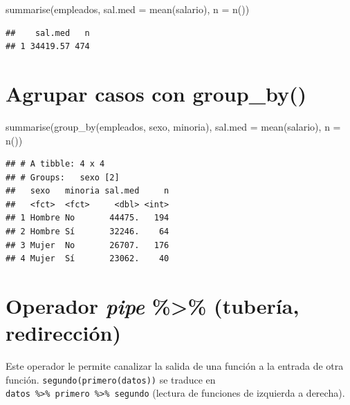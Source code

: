 \documentclass[
]{book}
\newenvironment{Shaded}{\begin{snugshade}}{\end{snugshade}}
\newcommand{\AttributeTok}[1]{\textcolor[rgb]{0.77,0.63,0.00}{#1}}
\newcommand{\FunctionTok}[1]{\textcolor[rgb]{0.00,0.00,0.00}{#1}}
\newcommand{\NormalTok}[1]{#1}
\theoremstyle{break}
\theoremstyle{nonumberplain}
\begin{document}
\begin{Shaded}
\begin{Highlighting}[]
\FunctionTok{summarise}\NormalTok{(empleados, }\AttributeTok{sal.med =} \FunctionTok{mean}\NormalTok{(salario), }\AttributeTok{n =} \FunctionTok{n}\NormalTok{())}
\end{Highlighting}
\end{Shaded}

\begin{verbatim}
##    sal.med   n
## 1 34419.57 474
\end{verbatim}

\hypertarget{agrupar-casos-con-group_by}{%
\section{\texorpdfstring{Agrupar casos con \textbf{group\_by()}}{Agrupar casos con group\_by()}}\label{agrupar-casos-con-group_by}}

\begin{Shaded}
\begin{Highlighting}[]
\FunctionTok{summarise}\NormalTok{(}\FunctionTok{group\_by}\NormalTok{(empleados, sexo, minoria), }\AttributeTok{sal.med =} \FunctionTok{mean}\NormalTok{(salario), }\AttributeTok{n =} \FunctionTok{n}\NormalTok{())}
\end{Highlighting}
\end{Shaded}

\begin{verbatim}
## # A tibble: 4 x 4
## # Groups:   sexo [2]
##   sexo   minoria sal.med     n
##   <fct>  <fct>     <dbl> <int>
## 1 Hombre No       44475.   194
## 2 Hombre Sí       32246.    64
## 3 Mujer  No       26707.   176
## 4 Mujer  Sí       23062.    40
\end{verbatim}

\hypertarget{operador-pipe-tuberuxeda-redirecciuxf3n}{%
\section{\texorpdfstring{Operador \emph{pipe} \textbf{\%\textgreater\% }(tubería, redirección)}{Operador pipe \%\textgreater\% (tubería, redirección)}}\label{operador-pipe-tuberuxeda-redirecciuxf3n}}

Este operador le permite canalizar la salida de una función a la entrada de otra función.
\texttt{segundo(primero(datos))} se traduce en \texttt{datos\ \%\textgreater{}\%\ primero\ \%\textgreater{}\%\ segundo}
(lectura de funciones de izquierda a derecha).
\end{document}
